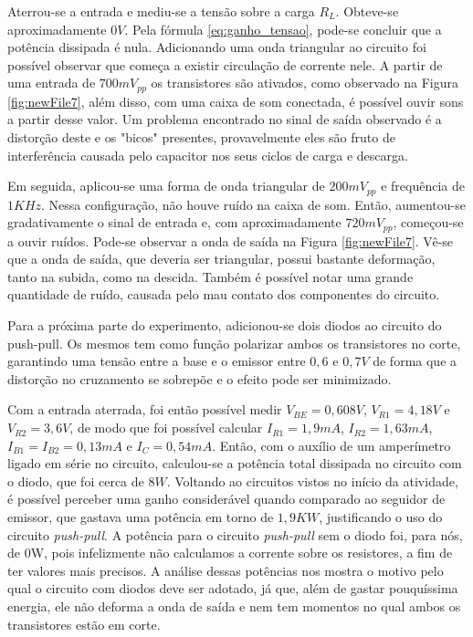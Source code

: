 \documentclass{pack}
\begin{document}
        Aterrou-se a entrada e mediu-se a tensão sobre a carga $R_L$. Obteve-se aproximadamente $0V$. Pela fórmula \ref{eq:ganho_tensao}, pode-se concluir que a potência dissipada é nula. Adicionando uma onda triangular ao circuito foi possível observar que começa a existir circulação de corrente nele. A partir de uma entrada de $700mV_{pp}$ os transistores são ativados, como observado na Figura \ref{fig:newFile7}, além disso, com uma caixa de som conectada, é possível ouvir sons a partir desse valor. Um problema encontrado no sinal de saída observado é a distorção deste e os "bicos" presentes, provavelmente eles são fruto de interferência causada pelo capacitor nos seus ciclos de carga e descarga.
        
        Em seguida, aplicou-se uma forma de onda triangular de $200mV_{pp}$ e frequência de $1KHz$. Nessa configuração, não houve ruído na caixa de som. Então, aumentou-se gradativamente o sinal de entrada e, com aproximadamente $720mV_{pp}$, começou-se a ouvir ruídos. Pode-se observar a onda de saída na Figura \ref{fig:newFile7}. Vê-se que a onda de saída, que deveria ser triangular, possui bastante deformação, tanto na subida, como na descida. Também é possível notar uma grande quantidade de ruído, causada pelo mau contato dos componentes do circuito.
        
        Para a próxima parte do experimento, adicionou-se dois diodos ao circuito do push-pull. Os mesmos tem como função polarizar ambos os transistores no corte, garantindo uma tensão entre a base e o emissor entre $0,6$ e $0,7V$ de forma que a distorção no cruzamento se sobrepõe e o efeito pode ser minimizado.
        
        Com a entrada aterrada, foi então possível medir $V_{BE} = 0,608V$, $V_{R1} = 4,18V$ e $V_{R2} = 3,6V$, de modo que foi possível calcular $I_{R1} = 1,9mA$, $I_{R2} = 1,63mA$, $I_{B1} = I_{B2} = 0,13mA$ e $I_{C} = 0,54mA$. Então, com o auxílio de um amperímetro ligado em série no circuito, calculou-se a potência total dissipada no circuito com o diodo, que foi cerca de $8W$. Voltando ao circuitos vistos no início da atividade, é possível perceber uma ganho considerável quando comparado ao seguidor de emissor, que gastava uma potência em torno de $1,9KW$, justificando o uso do circuito \emph{push-pull}. A potência para o circuito \emph{push-pull} sem o diodo foi, para nós, de 0W, pois infelizmente não calculamos a corrente sobre os resistores, a fim de ter valores mais precisos. A análise dessas potências nos mostra o motivo pelo qual o circuito com diodos deve ser adotado, já que, além de gastar pouquíssima energia, ele não deforma a onda de saída e nem tem momentos no qual ambos os transistores estão em corte.
        
\end{document}
